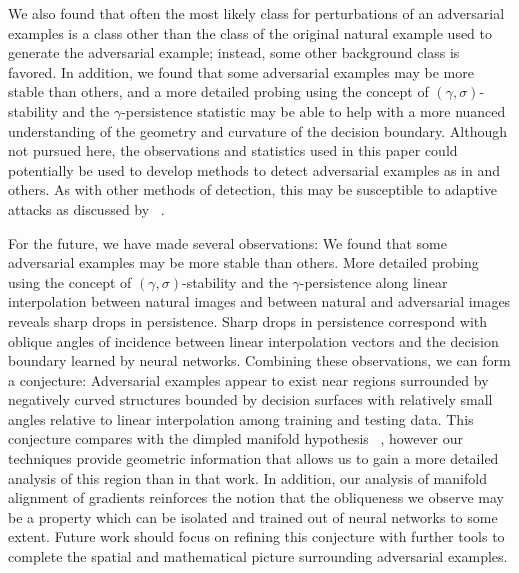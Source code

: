 We also found that often the most likely class for perturbations of an adversarial examples is a class other than the class of the original natural example used to generate the adversarial example; instead, some other background class is favored. In addition, we found that some adversarial examples may be more stable than others, and a more detailed probing using the concept of $(\gamma,\sigma)$-stability and the $\gamma$-persistence statistic may be able to help with a more nuanced understanding of the geometry and curvature of the decision boundary. Although not pursued here, the observations and statistics used in this paper could potentially be used to develop methods to detect adversarial examples as in \citep{crecchi2019,frosst2018,hosseini2019odds,Lee2018ASU,qin2020,roth19aodds} and others. As with other methods of detection, this may be susceptible to adaptive attacks as discussed by ~\citet{tramer2020adaptive}.

For the future, we have made several observations: We found that some adversarial examples may be more stable than others. More detailed probing using the concept of $(\gamma,\sigma)$-stability and the $\gamma$-persistence along linear interpolation between natural images and between natural and adversarial images reveals sharp drops in persistence. Sharp drops in persistence correspond with oblique angles of incidence between linear interpolation vectors and the decision boundary learned by neural networks. Combining these observations, we can form a conjecture: Adversarial examples appear to exist near regions surrounded by negatively curved structures bounded by decision surfaces with relatively small angles relative to linear interpolation among training and testing data. This conjecture compares with the dimpled manifold hypothesis ~\citep{shamir2021dimpled}, however our techniques provide geometric information that allows us to gain a more detailed analysis of this region than in that work. In addition, our analysis of manifold alignment of gradients reinforces the notion that the obliqueness we observe may be a property which can be isolated and trained out of neural networks to some extent. Future work should focus on refining this conjecture with further tools to complete the spatial and mathematical picture surrounding adversarial examples.


